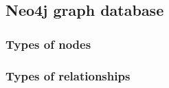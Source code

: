 
\subsection{Neo4j graph database} \label{ssec:neo4j-graph-database}

\subsubsection{Types of nodes} \label{sssec:types-of-nodes}

\subsubsection{Types of relationships} \label{sssec:types-of-relationships}

